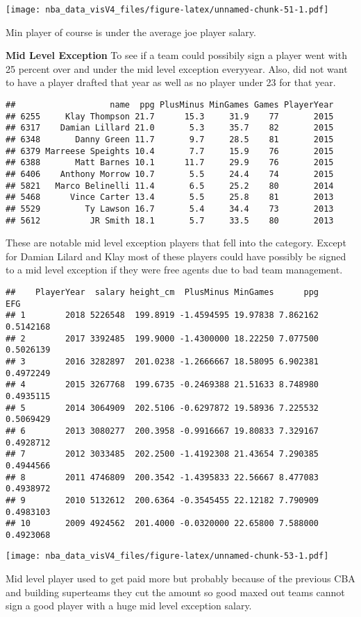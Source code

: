 \documentclass[]{article}
\begin{document}
\texttt{[image: nba\_data\_visV4\_files/figure-latex/unnamed-chunk-51-1.pdf]}

Min player of course is under the average joe player salary.

\textbf{Mid Level Exception } To see if a team could possibily sign a
player went with 25 percent over and under the mid level exception
everyyear. Also, did not want to have a player drafted that year as well
as no player under 23 for that year.

\begin{verbatim}
##                   name  ppg PlusMinus MinGames Games PlayerYear
## 6255     Klay Thompson 21.7      15.3     31.9    77       2015
## 6317    Damian Lillard 21.0       5.3     35.7    82       2015
## 6348       Danny Green 11.7       9.7     28.5    81       2015
## 6379 Marreese Speights 10.4       7.7     15.9    76       2015
## 6388       Matt Barnes 10.1      11.7     29.9    76       2015
## 6406    Anthony Morrow 10.7       5.5     24.4    74       2015
## 5821   Marco Belinelli 11.4       6.5     25.2    80       2014
## 5468      Vince Carter 13.4       5.5     25.8    81       2013
## 5529         Ty Lawson 16.7       5.4     34.4    73       2013
## 5612          JR Smith 18.1       5.7     33.5    80       2013
\end{verbatim}

These are notable mid level exception players that fell into the
category. Except for Damian Lilard and Klay most of these players could
have possibly be signed to a mid level exception if they were free
agents due to bad team management.

\begin{verbatim}
##    PlayerYear  salary height_cm  PlusMinus MinGames      ppg       EFG
## 1        2018 5226548  199.8919 -1.4594595 19.97838 7.862162 0.5142168
## 2        2017 3392485  199.9000 -1.4300000 18.22250 7.077500 0.5026139
## 3        2016 3282897  201.0238 -1.2666667 18.58095 6.902381 0.4972249
## 4        2015 3267768  199.6735 -0.2469388 21.51633 8.748980 0.4935115
## 5        2014 3064909  202.5106 -0.6297872 19.58936 7.225532 0.5069429
## 6        2013 3080277  200.3958 -0.9916667 19.80833 7.329167 0.4928712
## 7        2012 3033485  202.2500 -1.4192308 21.43654 7.290385 0.4944566
## 8        2011 4746809  200.3542 -1.4395833 22.56667 8.477083 0.4938972
## 9        2010 5132612  200.6364 -0.3545455 22.12182 7.790909 0.4983103
## 10       2009 4924562  201.4000 -0.0320000 22.65800 7.588000 0.4923068
\end{verbatim}

\texttt{[image: nba\_data\_visV4\_files/figure-latex/unnamed-chunk-53-1.pdf]}

Mid level player used to get paid more but probably because of the
previous CBA and building superteams they cut the amount so good maxed
out teams cannot sign a good player with a huge mid level exception
salary.
\end{document}
